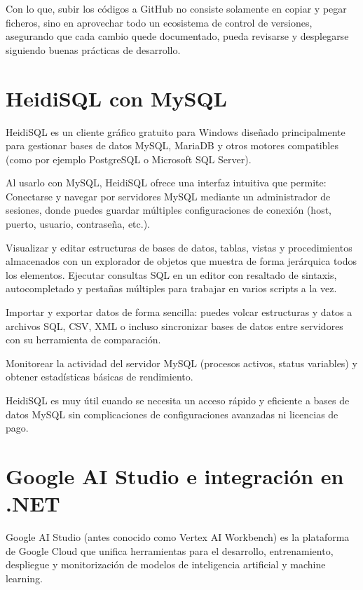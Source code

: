 Con lo que, subir los códigos a GitHub no consiste solamente en copiar y pegar ficheros, sino en aprovechar todo un ecosistema de control de versiones, asegurando que cada cambio quede documentado, pueda revisarse y desplegarse siguiendo buenas prácticas de desarrollo.


\section{HeidiSQL con MySQL}\label{heidi-sql}
HeidiSQL es un cliente gráfico gratuito para Windows diseñado principalmente para gestionar bases de datos MySQL, MariaDB y otros motores compatibles (como por ejemplo PostgreSQL o Microsoft SQL Server). 


Al usarlo con MySQL, HeidiSQL ofrece una interfaz intuitiva que permite:
Conectarse y navegar por servidores MySQL mediante un administrador de sesiones, donde puedes guardar múltiples configuraciones de conexión (host, puerto, usuario, contraseña, etc.).

Visualizar y editar estructuras de bases de datos, tablas, vistas y procedimientos almacenados con un explorador de objetos que muestra de forma jerárquica todos los elementos.
Ejecutar consultas SQL en un editor con resaltado de sintaxis, autocompletado y pestañas múltiples para trabajar en varios scripts a la vez.

Importar y exportar datos de forma sencilla: puedes volcar estructuras y datos a archivos SQL, CSV, XML o incluso sincronizar bases de datos entre servidores con su herramienta de comparación.

Monitorear la actividad del servidor MySQL (procesos activos, status variables) y obtener estadísticas básicas de rendimiento.


HeidiSQL es muy útil cuando se necesita un acceso rápido y eficiente a bases de datos MySQL sin complicaciones de configuraciones avanzadas ni licencias de pago.

\section{Google AI Studio e integración en .NET}\label{google-ai-studio}
Google AI Studio (antes conocido como Vertex AI Workbench) es la plataforma de Google Cloud que unifica herramientas para el desarrollo, entrenamiento, despliegue y monitorización de modelos de inteligencia artificial y machine learning. 

